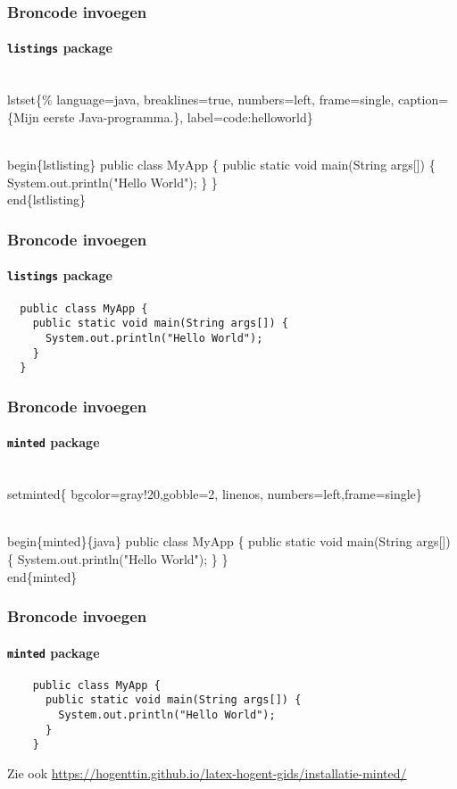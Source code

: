 \documentclass[aspectratio=169]{beamer}
\begin{document}
\begin{frame}[fragile]
  \frametitle{Broncode invoegen}
  \framesubtitle{\texttt{listings} package}

\begin{semiverbatim}
\\lstset\{\%
  language=java,  breaklines=true,  numbers=left,
  frame=single, caption=\{Mijn eerste Java-programma.\},
  label=code:helloworld\}

\alert{\\begin\{lstlisting\}}
public class MyApp \{
  public static void main(String args[]) \{
    System.out.println("Hello World");
  \}
\}
\alert{\\end\{lstlisting\}}
\end{semiverbatim}

\end{frame}

\begin{frame}[fragile]
  \frametitle{Broncode invoegen}
  \framesubtitle{\texttt{listings} package}


  \begin{lstlisting}
  public class MyApp {
    public static void main(String args[]) {
      System.out.println("Hello World");
    }
  }
  \end{lstlisting}

\end{frame}

\begin{frame}[fragile]
  \frametitle{Broncode invoegen}
  \framesubtitle{\texttt{minted} package}

\begin{semiverbatim}
\\setminted\{%
  bgcolor=gray!20,gobble=2, linenos,
  numbers=left,frame=single\}

\\begin\{minted\}\{java\}
  public class MyApp \{
    public static void main(String args[]) \{
      System.out.println("Hello World");
    \}
  \}
\\end\{minted\}
\end{semiverbatim}
\end{frame}

\begin{frame}[fragile]
  \frametitle{Broncode invoegen}
  \framesubtitle{\texttt{minted} package}
  \begin{verbatim}
    public class MyApp {
      public static void main(String args[]) {
        System.out.println("Hello World");
      }
    }
  \end{verbatim}

  \bigskip

  Zie ook \url{https://hogenttin.github.io/latex-hogent-gids/installatie-minted/}
\end{frame}
\end{document}
